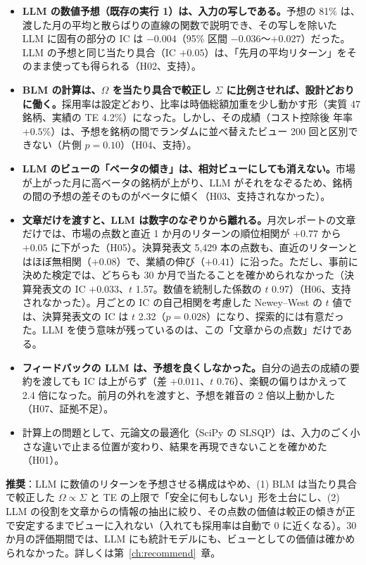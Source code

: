 \documentclass[xelatex,ja=standard,jafont=haranoaji,a4paper,10pt,openany]{bxjsreport}
\newcommand{\chapref}[1]{第~\ref{#1}~章}
\begin{document}
\begin{keybox}[主な結論]
\begin{itemize}
\item \textbf{LLM の数値予想（既存の実行 1）は、入力の写しである。}予想の 81\% は、渡した月の平均と散らばりの直線の関数で説明でき、その写しを除いた LLM に固有の部分の IC は $-0.004$（95\% 区間 $-0.036$〜$+0.027$）だった。LLM の予想と同じ当たり具合（IC $+0.05$）は、「先月の平均リターン」をそのまま使っても得られる（H02、支持）。
\item \textbf{BLM の計算は、$\Omega$ を当たり具合で較正し $\Sigma$ に比例させれば、設計どおりに働く。}採用率は設定どおり、比率は時価総額加重を少し動かす形（実質 47 銘柄、実績の TE 4.2\%）になった。しかし、その成績（コスト控除後 年率 $+0.5\%$）は、予想を銘柄の間でランダムに並べ替えたビュー 200 回と区別できない（片側 $p=0.10$）（H04、支持）。
\item \textbf{LLM のビューの「ベータの傾き」は、相対ビューにしても消えない。}市場が上がった月に高ベータの銘柄が上がり、LLM がそれをなぞるため、銘柄の間の予想の差そのものがベータに傾く（H03、支持されなかった）。
\item \textbf{文章だけを渡すと、LLM は数字のなぞりから離れる。}月次レポートの文章だけでは、市場の点数と直近 1 か月のリターンの順位相関が $+0.77$ から $+0.05$ に下がった（H05）。決算発表文 5,429 本の点数も、直近のリターンとはほぼ無相関（$+0.08$）で、業績の伸び（$+0.41$）に沿った。ただし、事前に決めた検定では、どちらも 30 か月で当たることを確かめられなかった（決算発表文の IC $+0.033$、$t$ 1.57。数値を統制した係数の $t$ 0.97）（H06、支持されなかった）。月ごとの IC の自己相関を考慮した Newey--West の $t$ 値では、決算発表文の IC は $t$ 2.32（$p=0.028$）になり、探索的には有意だった。LLM を使う意味が残っているのは、この「文章からの点数」だけである。
\item \textbf{フィードバックの LLM は、予想を良くしなかった。}自分の過去の成績の要約を渡しても IC は上がらず（差 $+0.011$、$t$ 0.76）、楽観の偏りはかえって 2.4 倍になった。前月の外れを渡すと、予想を雑音の 2 倍以上動かした（H07、証拠不足）。
\item 計算上の問題として、元論文の最適化（SciPy の SLSQP）は、入力のごく小さな違いで止まる位置が変わり、結果を再現できないことを確かめた（H01）。
\end{itemize}
\end{keybox}

\textbf{推奨}：LLM に数値のリターンを予想させる構成はやめ、(1) BLM は当たり具合で較正した $\Omega\propto\Sigma$ と TE の上限で「安全に何もしない」形を土台にし、(2) LLM の役割を文章からの情報の抽出に絞り、その点数の価値は較正の傾きが正で安定するまでビューに入れない（入れても採用率は自動で 0 に近くなる）。30 か月の評価期間では、LLM にも統計モデルにも、ビューとしての価値は確かめられなかった。詳しくは\chapref{ch:recommend}。
\end{document}
